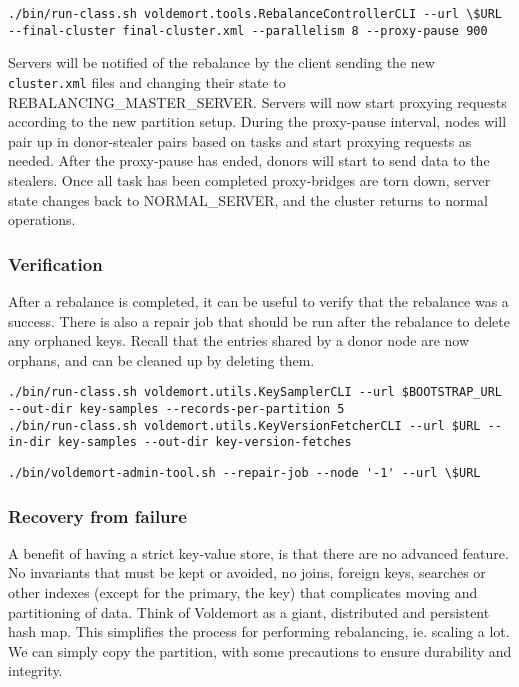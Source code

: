 \begin{lstlisting}[style=customc, caption=Sample command to execute the rebalance. Parallelism defines how many tasks can be run at the same time.]
./bin/run-class.sh voldemort.tools.RebalanceControllerCLI --url \$URL  --final-cluster final-cluster.xml --parallelism 8 --proxy-pause 900
\end{lstlisting}

Servers will be notified of the rebalance by the client sending the new \texttt{cluster.xml} files and changing their state to REBALANCING\_MASTER\_SERVER. Servers will now start proxying requests according to the new partition setup. During the proxy-pause interval, nodes will pair up in donor-stealer pairs based on tasks and start proxying requests as needed. After the proxy-pause has ended, donors will start to send data to the stealers. Once all task has been completed proxy-bridges are torn down, server state changes back to NORMAL\_SERVER, and the cluster returns to normal operations.

\subsubsection{Verification}
After a rebalance is completed, it can be useful to verify that the rebalance was a success. There is also a repair job that should be run after the rebalance to delete any orphaned keys. Recall that the entries shared by a donor node are now orphans, and can be cleaned up by deleting them.

\begin{lstlisting}[style=customc, caption=Commands for pulling a key sample from a store and the versioned data objects stored under the keys. These are used to verify that the rebalance did not corrupt data]
./bin/run-class.sh voldemort.utils.KeySamplerCLI --url $BOOTSTRAP_URL --out-dir key-samples --records-per-partition 5
./bin/run-class.sh voldemort.utils.KeyVersionFetcherCLI --url $URL --in-dir key-samples --out-dir key-version-fetches
\end{lstlisting}

\begin{lstlisting}[style=customc, caption=Sample repair job script. Passing -1 as node will run the script on all nodes.]
./bin/voldemort-admin-tool.sh --repair-job --node '-1' --url \$URL
\end{lstlisting}

\subsubsection{Recovery from failure}
A benefit of having a strict key-value store, is that there are no advanced feature. No invariants that must be kept or avoided, no joins, foreign keys, searches or other indexes (except for the primary, the key) that complicates moving and partitioning of data. 
Think of Voldemort as a giant, distributed and persistent hash map.
This simplifies the process for performing rebalancing, ie. scaling a lot. We can simply copy the partition, with some precautions to ensure durability and integrity.

